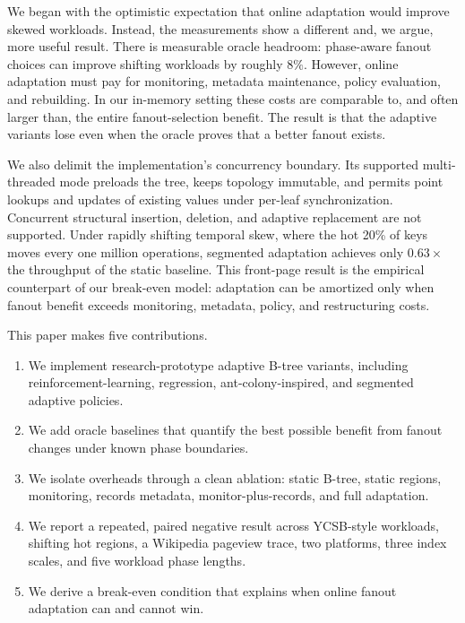 \documentclass[sigconf,review,anonymous]{acmart}
\begin{document}
We began with the optimistic expectation that online adaptation would improve
skewed workloads.  Instead, the measurements show a different and, we argue,
more useful result.  There is measurable oracle headroom: phase-aware fanout
choices can improve shifting workloads by roughly \(8\%\).  However, online
adaptation must pay for monitoring, metadata maintenance, policy evaluation,
and rebuilding.  In our in-memory setting these costs are comparable to, and
often larger than, the entire fanout-selection benefit.  The result is that the
adaptive variants lose even when the oracle proves that a better fanout exists.

We also delimit the implementation's concurrency boundary.  Its supported
multi-threaded mode preloads the tree, keeps topology immutable, and permits
point lookups and updates of existing values under per-leaf synchronization.
Concurrent structural insertion, deletion, and adaptive replacement are not
supported.  Under rapidly shifting temporal skew, where
the hot 20\% of keys moves every one million operations, segmented adaptation
achieves only \(0.63\times\) the throughput of the static baseline.  This
front-page result is the empirical counterpart of our break-even model:
adaptation can be amortized only when fanout benefit exceeds monitoring,
metadata, policy, and restructuring costs.

This paper makes five contributions.

\begin{enumerate}
  \item We implement research-prototype adaptive B-tree variants, including
  reinforcement-learning, regression, ant-colony-inspired, and segmented
  adaptive policies.
  \item We add oracle baselines that quantify the best possible benefit from
  fanout changes under known phase boundaries.
  \item We isolate overheads through a clean ablation: static B-tree, static
  regions, monitoring, records metadata, monitor-plus-records, and full
  adaptation.
  \item We report a repeated, paired negative result across YCSB-style
  workloads, shifting hot regions, a Wikipedia pageview trace, two platforms,
  three index scales, and five workload phase lengths.
  \item We derive a break-even condition that explains when online fanout
  adaptation can and cannot win.
\end{enumerate}
\end{document}
